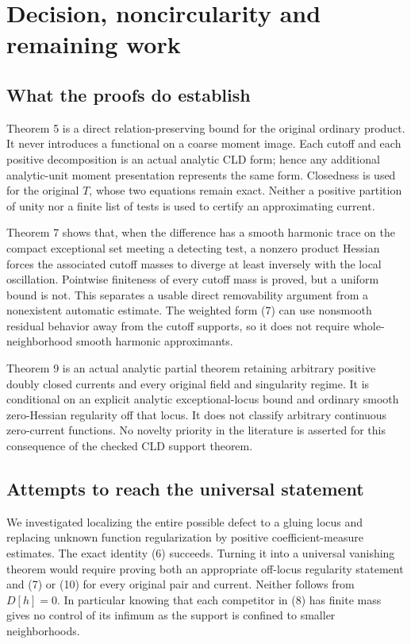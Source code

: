 \documentclass[11pt]{article}
\begin{document}
\section{Decision, noncircularity and remaining work}

\subsection{What the proofs do establish}

Theorem 5 is a direct relation-preserving bound for the original ordinary product. It never introduces a functional on a coarse moment image. Each cutoff and each positive decomposition is an actual analytic CLD form; hence any additional analytic-unit moment presentation represents the same form. Closedness is used for the original \(T\), whose two equations remain exact. Neither a positive partition of unity nor a finite list of tests is used to certify an approximating current.

Theorem 7 shows that, when the difference has a smooth harmonic trace on the compact exceptional set meeting a detecting test, a nonzero product Hessian forces the associated cutoff masses to diverge at least inversely with the local oscillation. Pointwise finiteness of every cutoff mass is proved, but a uniform bound is not. This separates a usable direct removability argument from a nonexistent automatic estimate. The weighted form (7) can use nonsmooth residual behavior away from the cutoff supports, so it does not require whole-neighborhood smooth harmonic approximants.

Theorem 9 is an actual analytic partial theorem retaining arbitrary positive doubly closed currents and every original field and singularity regime. It is conditional on an explicit analytic exceptional-locus bound and ordinary smooth zero-Hessian regularity off that locus. It does not classify arbitrary continuous zero-current functions. No novelty priority in the literature is asserted for this consequence of the checked CLD support theorem.

\subsection{Attempts to reach the universal statement}

We investigated localizing the entire possible defect to a gluing locus and replacing unknown function regularization by positive coefficient-measure estimates. The exact identity (6) succeeds. Turning it into a universal vanishing theorem would require proving both an appropriate off-locus regularity statement and (7) or (10) for every original pair and current. Neither follows from \(D[h]=0\). In particular knowing that each competitor in (8) has finite mass gives no control of its infimum as the support is confined to smaller neighborhoods.
\end{document}

